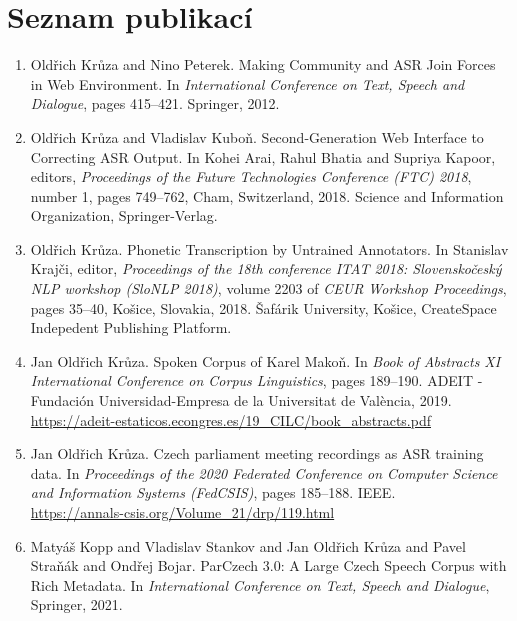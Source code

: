 \chapter*{Seznam publikací}

\begin{enumerate}
\item{
  Oldřich Krůza and Nino Peterek.
  Making Community and ASR Join Forces in Web Environment.
  In \textit{International Conference on Text, Speech and Dialogue},
  pages 415--421.
  Springer, 2012.
}
\item{
  Oldřich Krůza and Vladislav Kuboň.
  Second-Generation Web Interface to Correcting ASR Output.
  In Kohei Arai, Rahul Bhatia and Supriya Kapoor, editors,
  \textit{Proceedings of the Future Technologies Conference (FTC) 2018},
  number 1, pages 749--762, Cham, Switzerland, 2018.
  Science and Information Organization, Springer-Verlag.
}
\item{
  Oldřich Krůza.
  Phonetic Transcription by Untrained Annotators.
  In Stani\-slav Krajči, editor,
  \textit{Proceedings of the 18th conference ITAT 2018:
  Slovenskočeský NLP workshop (SloNLP 2018)},
  volume 2203 of \textit{CEUR Workshop Proceedings},
  pages 35--40,
  Košice, Slovakia, 2018.
  Šafárik University, Košice,
  CreateSpace Indepedent Publishing Platform.
}
\item{
  Jan Oldřich Krůza.
  Spoken Corpus of Karel Makoň.  
  In \textit{Book of Abstracts XI International Conference on Corpus Linguistics},
  pages 189--190.
  ADEIT - Fundación Universidad-Empresa de la Universitat de València, 2019.\\
  \url{https://adeit-estaticos.econgres.es/19\_CILC/book\_abstracts.pdf}
}
\item{
  Jan Oldřich Krůza.
  Czech parliament meeting recordings as ASR training data.
  In \textit{Proceedings of the 2020 Federated Conference on Computer Science
  and Information Systems (FedCSIS)},
  pages 185--188.
  IEEE.\\
  \url{https://annals-csis.org/Volume\_21/drp/119.html}
}
\item{
  Matyáš Kopp and Vladislav Stankov and Jan Oldřich Krůza and Pavel Straňák and Ondřej Bojar.
  ParCzech 3.0: A Large Czech Speech Corpus with Rich Metadata.
  In \textit{International Conference on Text, Speech and Dialogue},
  Springer, 2021.
}
\end{enumerate}
